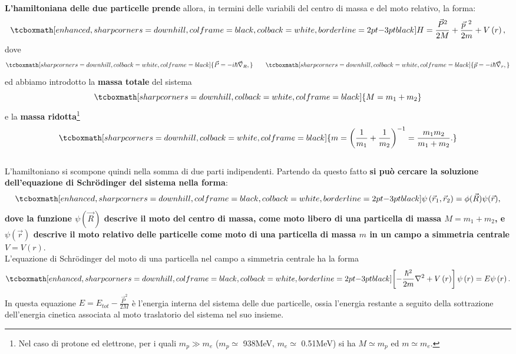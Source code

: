 \documentclass[a4paper,12pt,oneside]{book}
\begin{document}
\textbf{L'hamiltoniana delle due particelle prende} allora, in termini delle variabili del centro di massa e del moto relativo, la forma:
	\begin{equation}
		\tcboxmath[enhanced, sharp corners=downhill, colframe=black, colback=white, borderline={2pt}{-3pt}{black}]{
			H=\frac{\vec{P}^{2}}{2M}+\frac{\vec{p}^{\ 2}}{2m}+V\left(r\right) , 
			}
	\end{equation}
dove
	\begin{equation}
		\tcboxmath[sharp corners=downhill, colback=white, colframe=black]{
			\vec{P}=-i\hbar\vec{\nabla}_R,
			} \qquad
		\tcboxmath[sharp corners=downhill, colback=white, colframe=black]{
			\vec{p}=-i\hbar\vec{\nabla}_r ,
			}
\end{equation}
ed abbiamo introdotto la \textbf{massa totale} del sistema
	\begin{equation}
		\tcboxmath[sharp corners=downhill, colback=white, colframe=black]{
			M=m_1+m_2
			}
	\end{equation}
e la \textbf{massa ridotta}\footnote{Nel caso di protone ed elettrone, per i quali $m_p \gg m_e$ ($m_p \simeq$ 938MeV, $m_e\simeq$ 0.51MeV) si ha $M\simeq m_p$ ed $m\simeq m_e$.}
	\begin{equation}
		\tcboxmath[sharp corners=downhill, colback=white, colframe=black]{
			m=\left(\frac{1}{m_1}+\frac{1}{m_2}\right)^{-1}=\frac{m_1m_2}{m_1+m_2}.
			}
	\end{equation}\\
	
L'hamiltoniano si scompone quindi nella somma di due parti indipendenti. Partendo da questo fatto \textbf{si può cercare la soluzione dell'equazione di Schr\"{o}dinger del sistema nella forma}:
	\begin{equation}
		\tcboxmath[enhanced, sharp corners=downhill, colframe=black, colback=white, borderline={2pt}{-3pt}{black}]{
			\psi\left(\vec{r}_1,\vec{r}_2\right)=\phi(\vec{R})\psi(\vec{r}) ,
			}
	\end{equation}
\textbf{dove la funzione $\psi (\vec{R} )$ descrive il moto del centro di massa, come moto libero di una particella di massa $M=m_1+m_2$, e $\psi\left(\vec{r}\right)$ descrive il moto relativo delle particelle come moto di una particella di massa $m$ in un campo a simmetria centrale $V=V\left(r\right)$}.\\

L'equazione di Schr\"{o}dinger del moto di una particella nel campo a simmetria centrale ha la forma
	\begin{equation}
		\tcboxmath[enhanced, sharp corners=downhill, colframe=black, colback=white, borderline={2pt}{-3pt}{black}]{
			\left[-\frac{\hbar^2}{2m}\nabla^2+V\left( r \right) \right]\psi\left(r\right)=E\psi\left(r\right).
			}
	\label{21.1}
	\end{equation} 
In questa equazione \textbf{$E=E_{tot}-\frac{\vec{P}^2}{2M}$} è l'energia interna del sistema delle due particelle, ossia l'energia restante a seguito della sottrazione dell'energia cinetica associata al moto traslatorio del sistema nel suo insieme.\\ 
\end{document}
